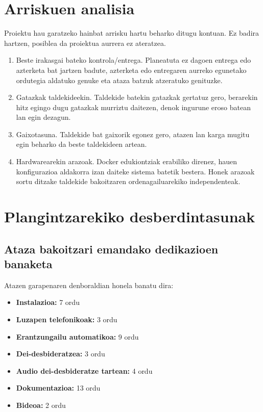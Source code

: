\section{Arriskuen analisia}

Proiektu hau garatzeko hainbat arrisku hartu beharko ditugu kontuan. Ez badira hartzen, posiblea da proiektua aurrera ez ateratzea.
\begin{enumerate}[label=R\arabic*.]
    \item Beste irakasgai bateko kontrola/entrega. Planeatuta ez dagoen entrega edo azterketa bat jartzen badute, azterketa edo entregaren aurreko egunetako ordutegia aldatuko genuke eta ataza batzuk atzeratuko genituzke.
    \item Gatazkak taldekideekin. Taldekide batekin gatazkak gertatuz gero, berarekin hitz egingo dugu gatazkak murriztu daitezen, denok ingurune eroso batean lan egin dezagun.
    \item Gaixotasuna. Taldekide bat gaixorik egonez gero, atazen lan karga mugitu egin beharko da beste taldekideen artean.
    \item Hardwarearekin arazoak. Docker edukiontziak erabiliko direnez, hauen konfigurazioa aldakorra izan daiteke sistema batetik bestera. Honek arazoak sortu ditzake taldekide bakoitzaren ordenagailuarekiko independenteak.
\end{enumerate}

\section{Plangintzarekiko desberdintasunak}

\subsection{Ataza bakoitzari emandako dedikazioen banaketa}

Atazen garapenaren denboraldian honela banatu dira:
\begin{itemize}
    \item \textbf{Instalazioa:} 7 ordu
    \item \textbf{Luzapen telefonikoak:} 3 ordu
    \item \textbf{Erantzungailu automatikoa:} 9 ordu
    \item \textbf{Dei-desbideratzea:} 3 ordu
    \item \textbf{Audio dei-desbideratze tartean:} 4 ordu
    \item \textbf{Dokumentazioa:} 13 ordu
    \item \textbf{Bideoa:} 2 ordu
\end{itemize}

